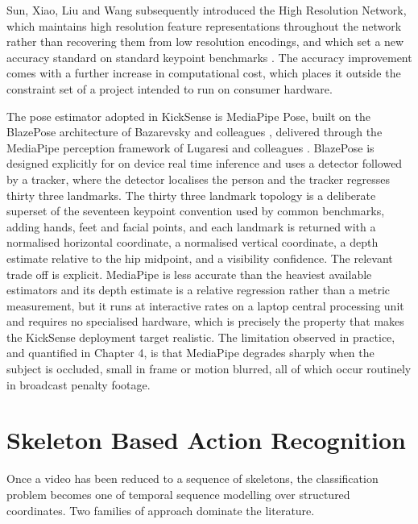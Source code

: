 Sun, Xiao, Liu and Wang subsequently introduced the High Resolution Network, which maintains high resolution feature representations throughout the network rather than recovering them from low resolution encodings, and which set a new accuracy standard on standard keypoint benchmarks \cite{sun2019}. The accuracy improvement comes with a further increase in computational cost, which places it outside the constraint set of a project intended to run on consumer hardware.

The pose estimator adopted in KickSense is MediaPipe Pose, built on the BlazePose architecture of Bazarevsky and colleagues \cite{bazarevsky2020}, delivered through the MediaPipe perception framework of Lugaresi and colleagues \cite{lugaresi2019}. BlazePose is designed explicitly for on device real time inference and uses a detector followed by a tracker, where the detector localises the person and the tracker regresses thirty three landmarks. The thirty three landmark topology is a deliberate superset of the seventeen keypoint convention used by common benchmarks, adding hands, feet and facial points, and each landmark is returned with a normalised horizontal coordinate, a normalised vertical coordinate, a depth estimate relative to the hip midpoint, and a visibility confidence. The relevant trade off is explicit. MediaPipe is less accurate than the heaviest available estimators and its depth estimate is a relative regression rather than a metric measurement, but it runs at interactive rates on a laptop central processing unit and requires no specialised hardware, which is precisely the property that makes the KickSense deployment target realistic. The limitation observed in practice, and quantified in Chapter 4, is that MediaPipe degrades sharply when the subject is occluded, small in frame or motion blurred, all of which occur routinely in broadcast penalty footage.

\section{Skeleton Based Action Recognition}

Once a video has been reduced to a sequence of skeletons, the classification problem becomes one of temporal sequence modelling over structured coordinates. Two families of approach dominate the literature.


